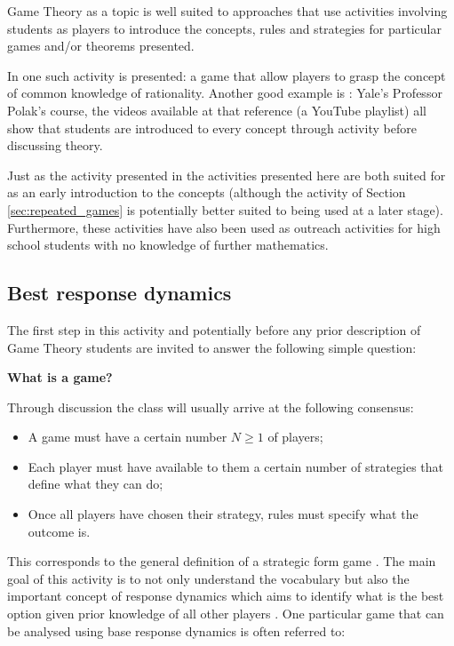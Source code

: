 \documentclass[12pt]{article}
\begin{document}
Game Theory as a topic is well suited to approaches that use activities
involving students as players to introduce the concepts, rules and strategies
for particular games and/or theorems presented.

In \cite{Brokaw2004} one such activity is presented: a game that allow players
to grasp the concept of common knowledge of rationality. Another good example is
\cite{Polak2008}: Yale's Professor Polak's course, the videos available at that
reference (a YouTube playlist) all show that students are introduced to every
concept through activity before discussing theory.

Just as the activity presented in \cite{Brokaw2004} the activities presented
here are both suited for as an early introduction to the concepts (although the
activity of Section \ref{sec:repeated_games} is potentially better suited to
being used at a later stage). Furthermore, these activities have also been used
as outreach activities for high school students with no knowledge of further
mathematics.

\subsection{Best response dynamics}\label{sec:best_responses}

The first step in this activity and potentially before any prior description of
Game Theory students are invited to answer the following simple question:

\begin{center}
    \textbf{What is a game?}
\end{center}

Through discussion the class will usually arrive at the following consensus:

\begin{itemize}
    \item A game must have a certain number \(N\geq 1\) of players;
    \item Each player must have available to them a certain number of strategies
        that define what they can do;
    \item Once all players have chosen their strategy, rules must specify what
        the outcome is.
\end{itemize}

This corresponds to the general definition of a strategic form game
\cite{Maschler2013}. The main goal of this activity is to not only understand
the vocabulary but also the important concept of response dynamics which aims
to identify what is the best option given prior knowledge of all other players
\cite{Maschler2013}. One particular game that can be analysed using base
response dynamics is often referred to:
\end{document}
